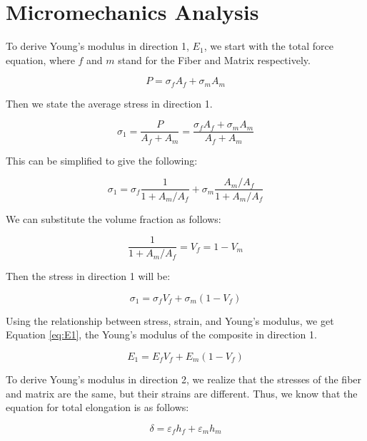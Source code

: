 \section{Micromechanics Analysis}

To derive Young's modulus in direction 1, $E_1$, we start with the total force equation, where $f$ and $m$ stand for the Fiber and Matrix respectively.

\begin{equation}
P=\sigma_f A_f + \sigma_m A_m
\end{equation}

Then we state the average stress in direction 1.

\begin{equation}
\sigma_1 = \frac{P}{A_f + A_m} = \frac{\sigma_f A_f + \sigma_m A_m}{A_f + A_m}
\end{equation}

This can be simplified to give the following:

\begin{equation}
\sigma_1 = \sigma_f \frac{1}{1+A_m/A_f} + \sigma_m \frac{A_m/A_f}{1+A_m/A_f}
\end{equation}

We can substitute the volume fraction as follows:

\begin{equation}
\frac{1}{1+A_m/A_f} = V_f = 1 - V_m
\end{equation}

Then the stress in direction 1 will be:

\begin{equation}
\sigma_1 = \sigma_f V_f + \sigma_m (1-V_f)
\end{equation}

Using the relationship between stress, strain, and Young's modulus, we get Equation \ref{eq:E1}, the Young's modulus of the composite in direction 1.

\begin{equation} \label{eq:E1}
E_1 = E_f V_f + E_m (1-V_f)
\end{equation}

To derive Young's modulus in direction 2, we realize that the stresses of the fiber and matrix are the same, but their strains are different. Thus, we know that the equation for total elongation is as follows:

\begin{equation}
\delta = \varepsilon_f h_f + \varepsilon_m h_m
\end{equation}

